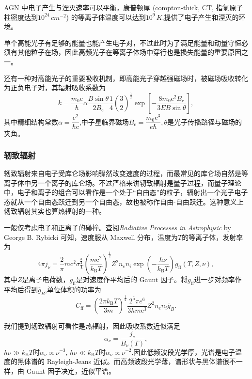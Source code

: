 \documentclass[../天体物理基础.tex]{subfiles}
\begin{document}
AGN 中电子产生与湮灭速率可以平衡，康普顿厚 (compton-thick, CT, 指氢原子柱密度达到$10^{24}\,\unit{cm^{-2}}$) 的等离子体温度可以达到$10^{9}\,\unit{K}$,提供了电子产生和湮灭的环境。

单个高能光子有足够的能量也能产生电子对，不过此时为了满足能量和动量守恒必须有其他粒子在场，因此高频光子在等离子体场中穿行也是损失能量的重要原因之一。

还有一种对高能光子的重要吸收机制，即高能光子穿越强磁场时，被磁场吸收转化为正负电子对，其辐射吸收系数为
\begin{equation}
k=\frac{m_{0}\mathrm{c}}{\hbar}\alpha\frac{B\sin\theta}{2B_\mathrm{c}}\frac{1}{4}\left(\frac{3}{2}\right)^{\frac{1}{2}}\exp\left[-\frac{8m_{0}\mathrm{c}^{2}B_\mathrm{c}}{3EB\sin\theta}\right],
\end{equation}
其中精细结构常数$\alpha=\dfrac{e^{2}}{\hbar\mathrm{c}}$,中子星临界磁场$B_\mathrm{c}=\dfrac{m_{0}\mathrm{c}^{3}}{e\hbar},\theta$是光子传播路径与磁场的夹角。

\subsubsection{轫致辐射}
轫致辐射来自电子受库仑场影响骤然改变速度的过程，而最常见的库仑场自然是等离子体中另一个离子的库仑场。不过严格来讲轫致辐射是量子过程，而量子理论中，电子和离子的组合可以看作是一个处于“自由态”的粒子，辐射出一个光子电子态就从一个自由态跃迁到另一个自由态，故也被称作自由{}-{}自由跃迁。这种意义上轫致辐射其实也算热辐射的一种。

一般仅考虑电子和正离子的碰撞。查阅\textit{Radiative Processes in Astrophysic} by George B. Rybicki 可知，速度服从 Maxwell 分布，温度为$T$的等离子体，发射率为
\begin{equation}
4\pi j_{\nu}=\frac{2}{\pi}m\mathrm{c}^{2}\sigma_{\text{T}}^{\frac{3}{2}}\left(\frac{m\mathrm{c}^{2}}{k_{\text{B}}T}\right)^{\frac{1}{2}}Z^{2}n_{e}n_{i}\exp\left(-\frac{h\nu}{k_{\text{B}}T}\right)\overline{g}_{\text{ff}}\left(T,Z,\nu\right),
\end{equation}
其中$Z$是离子电荷数，$\overline{g}_{\text{ff}}$是对速度作平均后的 Gaunt 因子。将$\overline{g}_{\text{ff}}$进一步对频率作平均后得到$\overline{g}_{B}$,单位体积的功率为
\begin{equation}
C_{\text{ff}}=\left(\frac{2\pi k_{\text{B}}T}{3m}\right)^{\frac{1}{2}}\frac{2^{5}\pi e^{6}}{3hm\mathrm{c}^{3}}Z^{2}n_{e}n_{i}\overline{g}_{B}.
\end{equation}

我们提到轫致辐射可看作是热辐射，因此吸收系数近似满足
\begin{equation}
\alpha_{\nu}=\frac{j_{\nu}}{B_{\nu}\left(T\right)},
\end{equation}
$h\nu\gg k_{\text{B}}T$时$\alpha_{\nu}\propto{}\nu^{-3}$, $h\nu\ll k_{\text{B}}T$时$\alpha_{\nu}\propto{}\nu^{-2}$.因此低频波段光学厚，光谱是电子温度的黑体谱的 Rayleigh-Jeans 近似。而高频波段光学薄，谱形状与黑体谱很不一样，由 Gaunt 因子决定，近似平谱。
\end{document}
